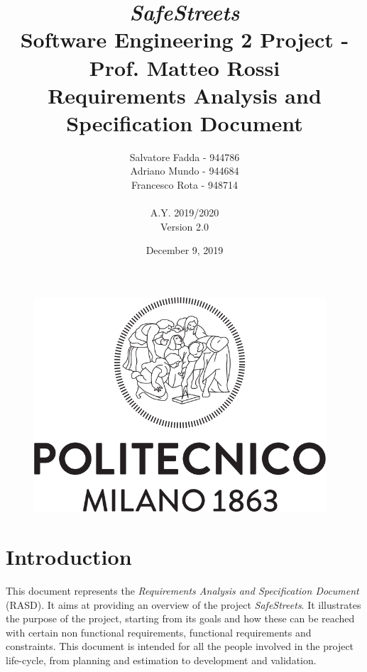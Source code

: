 \documentclass {article}
\begin{document}
\begin{figure}
\centering
	\includegraphics[height=8cm]{polimi_logo.png}
\end{figure}


\title {{\Huge \it SafeStreets} \\ \Large Software Engineering 2 Project - Prof. Matteo Rossi \\  {\bf Requirements Analysis and Specification Document}
}
\author{Salvatore Fadda - 944786\\Adriano Mundo - 944684 \\ Francesco Rota - 948714
		\\ \\ A.Y. 2019/2020 \\ Version 2.0}
\date{December 9, 2019}



\maketitle
\newpage

	
\tableofcontents
\newpage


\section{Introduction}
This document represents the {\it Requirements Analysis and Specification Document} (RASD). It aims at providing an overview of the project {\it SafeStreets}. It illustrates the purpose of the project, starting from its goals and how these can be reached with certain non functional requirements, functional requirements and constraints. This document is intended for all the people involved in the project life-cycle, from planning and estimation to development and validation.
\end{document}
